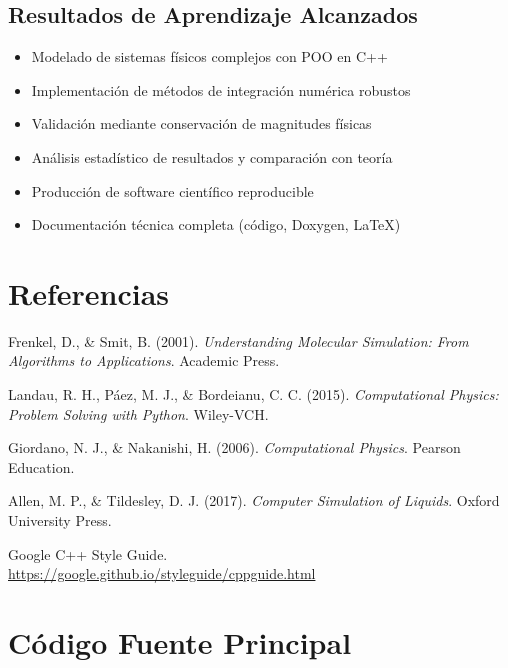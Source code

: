 \documentclass[12pt,a4paper]{article}
\begin{document}
\subsection{Resultados de Aprendizaje Alcanzados}

\begin{itemize}
    \item [\checkmark] Modelado de sistemas físicos complejos con POO en C++
    \item [\checkmark] Implementación de métodos de integración numérica robustos
    \item [\checkmark] Validación mediante conservación de magnitudes físicas
    \item [\checkmark] Análisis estadístico de resultados y comparación con teoría
    \item [\checkmark] Producción de software científico reproducible
    \item [\checkmark] Documentación técnica completa (código, Doxygen, LaTeX)
\end{itemize}

\section*{Referencias}

\begin{thebibliography}{9}

Frenkel, D., \& Smit, B. (2001). 
\textit{Understanding Molecular Simulation: From Algorithms to Applications}. 
Academic Press.

Landau, R. H., Páez, M. J., \& Bordeianu, C. C. (2015). 
\textit{Computational Physics: Problem Solving with Python}. 
Wiley-VCH.

Giordano, N. J., \& Nakanishi, H. (2006). 
\textit{Computational Physics}. 
Pearson Education.

Allen, M. P., \& Tildesley, D. J. (2017). 
\textit{Computer Simulation of Liquids}. 
Oxford University Press.

Google C++ Style Guide. \\
\url{https://google.github.io/styleguide/cppguide.html}

\end{thebibliography}

\appendix

\section{Código Fuente Principal}
\end{document}
